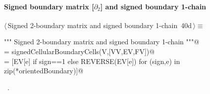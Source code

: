 \documentclass[11pt,oneside]{article}	%
\begin{document}
\paragraph{Signed boundary matrix [$\partial_2$] and signed boundary 1-chain}
\begin{flushleft} \small \label{scrap66}
\protect{}$\langle\,$Signed 2-boundary matrix and signed boundary 1-chain\nobreak\ {\footnotesize 40d}$\,\rangle\equiv$
\vspace{-1ex}
\begin{list}{}{} \item
\mbox{}\verb@""" Signed 2-boundary matrix  and signed boundary 1-chain """@\\
\mbox{}\verb@orientedBoundary = signedCellularBoundaryCells(V,[VV,EV,FV])@\\
\mbox{}\verb@cells = [EV[e] if sign==1 else REVERSE(EV[e]) for (sign,e) in zip(*orientedBoundary)]@\\
\mbox{}\verb@@{\NWsep}
\end{list}
\vspace{-1ex}
\footnotesize\addtolength{\baselineskip}{-1ex}
\begin{list}{}{\setlength{\itemsep}{-\parsep}\setlength{\itemindent}{-\leftmargin}}
\item \NWtxtMacroRefIn\ .
\end{list}
\end{flushleft}
\end{document}

